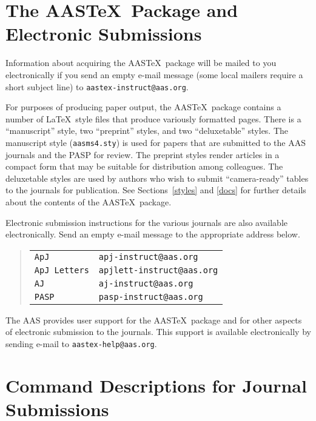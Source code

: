 
\section{The AAS\TeX\ Package and Electronic Submissions}

Information about acquiring the AAS\TeX\ package will be mailed to you
electronically if you send an empty e-mail message (some local mailers require
a short subject line) to {\tt aastex-instruct@aas.org}. 

For purposes of producing paper output, the AAS\TeX\ package contains
a number of \LaTeX\ style files that produce variously formatted pages.
There is a ``manuscript'' style, two ``preprint'' styles, and
two ``deluxetable'' styles.
The manuscript style ({\tt aasms4.sty}) is used for papers that are submitted to
the AAS journals and the PASP for review.
The preprint styles render articles in a compact form that may
be suitable for distribution among colleagues.
The deluxetable styles are used by authors who wish to submit
``camera-ready'' tables to the journals for publication.  See Sections~\ref{styles} 
and \ref{docs} for further details about the contents of the AAS\TeX\ package.

Electronic submission instructions for the various journals are also
available electronically.  Send an empty e-mail message to
the appropriate address below.

\begin{quote}
\begin{tabular}{l@{\quad}p{2in}}
{\tt ApJ} & {\tt apj-instruct@aas.org}\\
{\tt ApJ Letters} & {\tt apjlett-instruct@aas.org}\\
{\tt AJ} & {\tt aj-instruct@aas.org}\\
{\tt PASP} & {\tt pasp-instruct@aas.org}\\
\end{tabular}
\end{quote}

The AAS provides user support for the AAS\TeX\ package and for other
aspects of electronic submission to the journals.  This support is 
available electronically by sending e-mail to {\tt aastex-help@aas.org}.

\section{Command Descriptions for Journal Submissions}


